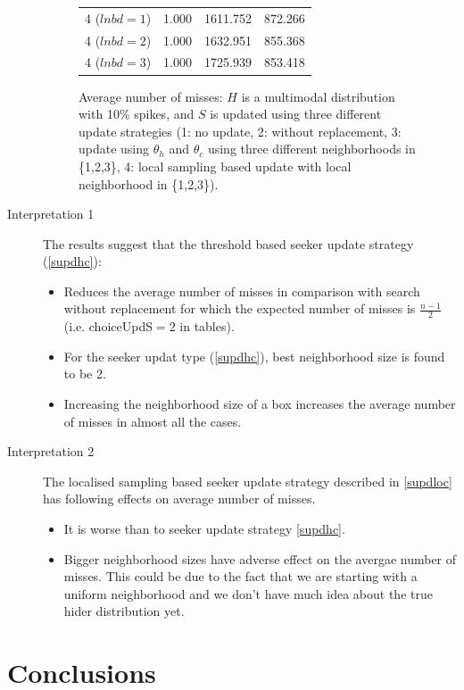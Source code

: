 \documentclass[11pt,a4paper]{article}
\begin{document}
\begin{description}
\begin{figure}[!h]
\begin{tabular}{llll}
		4 ($lnbd=1$) & 1.000 & 1611.752 & 872.266 \\
		4 ($lnbd=2$) & 1.000 & 1632.951 & 855.368 \\
		4 ($lnbd=3$) & 1.000 & 1725.939 & 853.418 \\
		\hline 
		\hline 
	\end{tabular}
	\caption{Average number of misses: $H$ is a multimodal distribution with 10\% spikes, and $S$ is updated using three different update strategies (1: no update, 2: without replacement, 3: update using $\theta_h$ and $\theta_c$ using three different neighborhoods in \{1,2,3\}, 4: local sampling based update with local neighborhood in \{1,2,3\}).}
	\end{figure}

	\item[Interpretation 1] The results suggest that the threshold based seeker update strategy (\ref{supdhc}):
	\begin{itemize}
		\item Reduces the average number of misses in comparison with search without replacement for which the expected number of misses is $\frac{n-1}{2}$ (i.e. choiceUpdS$=2$ in tables).
		\item For the seeker updat type (\ref{supdhc}), best neighborhood size is found to be 2. 
		\item Increasing the neighborhood size of a box increases the average number of misses in almost all the cases.
	\end{itemize}

	\item[Interpretation 2] The localised sampling based seeker update strategy described in \ref{supdloc} has following effects on average number of misses.
	\begin{itemize}
		\item It is worse than to seeker update strategy \ref{supdhc}.
		\item Bigger neighborhood sizes have adverse effect on the avergae number of misses. This could be due to the fact that we are starting with a uniform neighborhood and we don't have much idea about the true hider distribution yet.
	\end{itemize}
	
\end{description}

\section{Conclusions}
\end{document}
